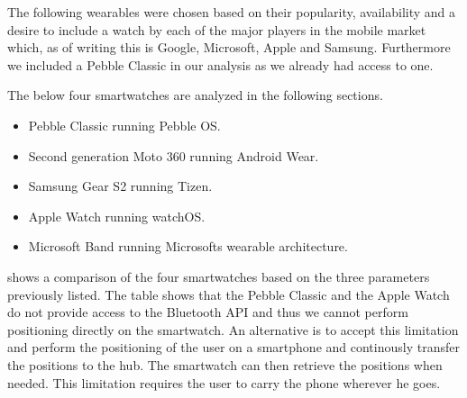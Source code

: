 The following wearables were chosen based on their popularity, availability and a desire to include a watch by each of the major players in the mobile market which, as of writing this is Google, Microsoft, Apple and Samsung. Furthermore we included a Pebble Classic in our analysis as we already had access to one.

The below four smartwatches are analyzed in the following sections.

\begin{itemize}
\item Pebble Classic running Pebble OS.
\item Second generation Moto 360 running Android Wear.
\item Samsung Gear S2 running Tizen.
\item Apple Watch running watchOS.
\item Microsoft Band running Microsofts wearable architecture.
\end{itemize}

 shows a comparison of the four smartwatches based on the three parameters previously listed. The table shows that the Pebble Classic and the Apple Watch do not provide access to the Bluetooth API and thus we cannot perform positioning directly on the smartwatch. An alternative is to accept this limitation and perform the positioning of the user on a smartphone and continously transfer the positions to the hub. The smartwatch can then retrieve the positions when needed.
This limitation requires the user to carry the phone wherever he goes.

